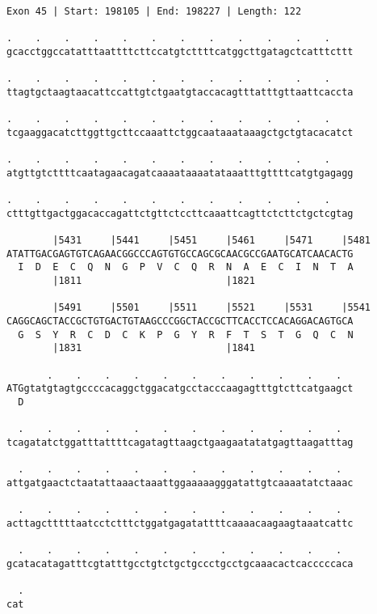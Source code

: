 \documentclass{article}
\begin{document}
\begin{Verbatim}[fontfamily=courier]
Exon 45 | Start: 198105 | End: 198227 | Length: 122

.    .    .    .    .    .    .    .    .    .    .    .    
gcacctggccatatttaattttcttccatgtcttttcatggcttgatagctcatttcttt

.    .    .    .    .    .    .    .    .    .    .    .    
ttagtgctaagtaacattccattgtctgaatgtaccacagtttatttgttaattcaccta

.    .    .    .    .    .    .    .    .    .    .    .    
tcgaaggacatcttggttgcttccaaattctggcaataaataaagctgctgtacacatct

.    .    .    .    .    .    .    .    .    .    .    .    
atgttgtcttttcaatagaacagatcaaaataaaatataaatttgttttcatgtgagagg

.    .    .    .    .    .    .    .    .    .    .    .    
ctttgttgactggacaccagattctgttctccttcaaattcagttctcttctgctcgtag

        |5431     |5441     |5451     |5461     |5471     |5481
ATATTGACGAGTGTCAGAACGGCCCAGTGTGCCAGCGCAACGCCGAATGCATCAACACTG
  I  D  E  C  Q  N  G  P  V  C  Q  R  N  A  E  C  I  N  T  A
        |1811                         |1821                 

        |5491     |5501     |5511     |5521     |5531     |5541
CAGGCAGCTACCGCTGTGACTGTAAGCCCGGCTACCGCTTCACCTCCACAGGACAGTGCA
  G  S  Y  R  C  D  C  K  P  G  Y  R  F  T  S  T  G  Q  C  N
        |1831                         |1841                 

       .    .    .    .    .    .    .    .    .    .    .  
ATGgtatgtagtgccccacaggctggacatgcctacccaagagtttgtcttcatgaagct
  D                                                         

  .    .    .    .    .    .    .    .    .    .    .    .  
tcagatatctggatttattttcagatagttaagctgaagaatatatgagttaagatttag

  .    .    .    .    .    .    .    .    .    .    .    .  
attgatgaactctaatattaaactaaattggaaaaagggatattgtcaaaatatctaaac

  .    .    .    .    .    .    .    .    .    .    .    .  
acttagctttttaatcctctttctggatgagatattttcaaaacaagaagtaaatcattc

  .    .    .    .    .    .    .    .    .    .    .    .  
gcatacatagatttcgtatttgcctgtctgctgccctgcctgcaaacactcacccccaca

  .
cat
\end{Verbatim}
\newpage
\end{document}
